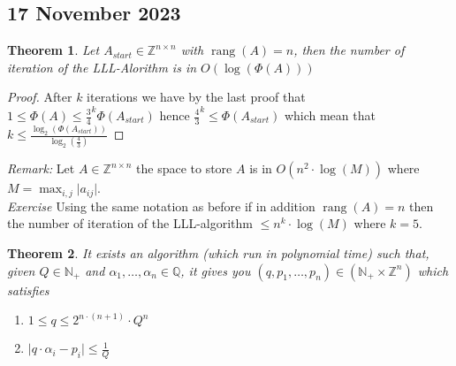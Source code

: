 \documentclass[a4paper,11pt,american]{article}
\newcommand{\N}{\mathbb{N}}
\newcommand{\Q}{\mathbb{Q}}
\newcommand{\Z}{\mathbb{Z}}
\DeclareMathOperator{\rank}{rang}
\theoremstyle{plain}
\newtheorem{theorem}{Theorem}
\theoremstyle{definition}
\begin{document}
\subsection*{17 November 2023}
\begin{theorem}
    Let $A_{start}\in \Z^{n\times n}$ with $\rank(A)=n$, then the number of iteration of the LLL-Alorithm is in $O(\log(\Phi(A)))$
\end{theorem}
\begin{proof}
    After $k$ iterations we have by the last proof that $1\leq \Phi(A)\leq\frac{3}{4}^k \Phi(A_{start})$ hence $\frac{4}{3}^k\leq\Phi(A_{start})$ which mean that $k\leq\frac{\log_2(\Phi(A_{start}))}{\log_2(\frac{4}{3})}$
\end{proof}
\emph{Remark:} Let $A\in\Z^{n\times n}$ the space to store $A$ is in $O(n^2\cdot \log(M))$ where $M=\max_{i,j}\vert a_{ij}\vert$.\\
\emph{Exercise} Using the same notation as before if in addition $\rank(A)=n$ then the number of iteration of the LLL-algorithm $\leq n^k\cdot \log(M)$ where $k=5$.
\begin{theorem}
    It exists an algorithm (which run in polynomial time) such that, given $Q\in \N_+$ and $\alpha_1,\dots,\alpha_n\in \Q$, it gives you $(q,p_1,\dots,p_n)\in (\N_+\times\Z^n)$ which satisfies \begin{enumerate}
        \item $1\leq q\leq 2^{n\cdot(n+1)}\cdot Q^n$
        \item $\vert q\cdot\alpha_i-p_i\vert \leq\frac{1}{Q}$
    \end{enumerate}
\end{theorem}
\end{document}

